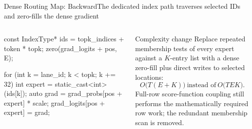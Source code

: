 \documentclass[aspectratio=169,10pt]{beamer}
\renewcommand{\NvidiaSource}[1]{}
\begin{document}
\begin{frame}[fragile]{Dense Routing Map: Backward}{The dedicated index path traverses selected IDs and zero-fills the dense gradient}
  \NvidiaSource{TE PR \href{https://github.com/NVIDIA/TransformerEngine/pull/3129}{\#3129};
    \texttt{TE/.../fused\_router/fused\_topk\_with\_score\_function.cu}}
  \begin{columns}[T,onlytextwidth]
    \begin{column}{.57\textwidth}
      \begin{NvidiaCode}[language=NvidiaCUDA,basicstyle=\ttfamily\fontsize{6.7}{7.9}\selectfont]
const IndexType* ids = topk_indices + token * topk;
zero(grad_logits + pos, E);

for (int k = lane_id; k < topk; k += 32) {
  int expert = static_cast<int>(ids[k]);
  auto grad = grad_probs[pos + expert] * scale;
  grad_logits[pos + expert] = grad;
}
      \end{NvidiaCode}
    \end{column}
    \begin{column}{.38\textwidth}
      {\NvidiaSansMedium Complexity change}\NvidiaTightRule{.6pt}\vspace{.07in}
      \small Replace repeated membership tests of every expert against a $K$-entry list with a
      dense zero-fill plus direct writes to selected locations:
      \[
        O\bigl(T(E+K)\bigr)\ \text{instead of}\ O\bigl(TEK\bigr).
      \]
      \small Full-row score-function coupling still performs the mathematically required row
      work; the redundant membership scan is removed.
    \end{column}
  \end{columns}
\end{frame}
\end{document}

